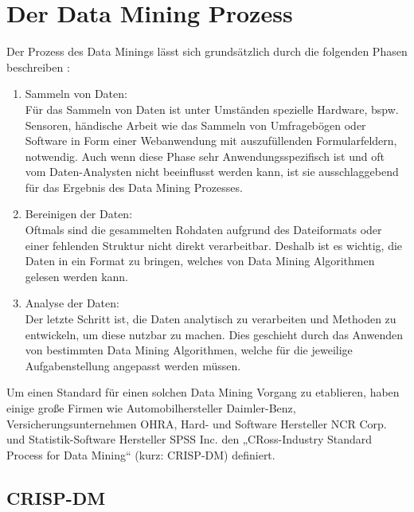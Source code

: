 %


%
%
\chapter{Der Data Mining Prozess}
\label{sec:process}

Der Prozess des Data Minings lässt sich grundsätzlich durch die folgenden Phasen
beschreiben \cite{North:12}:
\begin{enumerate}
\item Sammeln von Daten: \\
Für das Sammeln von Daten ist unter Umständen spezielle Hardware, bspw.
Sensoren, händische Arbeit wie das Sammeln von Umfragebögen oder Software in
Form einer Webanwendung mit auszufüllenden Formularfeldern, notwendig. Auch wenn
diese Phase sehr Anwendungsspezifisch ist und oft vom Daten-Analysten nicht
beeinflusst werden kann, ist sie ausschlaggebend für das Ergebnis des Data
Mining Prozesses.
\item Bereinigen der Daten: \\
Oftmals sind die gesammelten Rohdaten aufgrund des Dateiformats oder einer
fehlenden Struktur nicht direkt verarbeitbar. Deshalb ist es wichtig, die Daten
in ein Format zu bringen, welches von Data Mining Algorithmen gelesen werden
kann.
\item Analyse der Daten: \\
Der letzte Schritt ist, die Daten analytisch zu verarbeiten und Methoden zu
entwickeln, um diese nutzbar zu machen. Dies geschieht durch das Anwenden von
bestimmten Data Mining Algorithmen, welche für die jeweilige Aufgabenstellung
angepasst werden müssen.
\end{enumerate}
Um einen Standard für einen solchen Data Mining Vorgang zu etablieren, haben
einige große Firmen wie Automobilhersteller Daimler-Benz, Versicherungsunternehmen
OHRA, Hard- und Software Hersteller NCR Corp. und Statistik-Software
Hersteller SPSS Inc. den „CRoss-Industry Standard Process for Data Mining“
(kurz: CRISP-DM) definiert.

\pagebreak

\section{CRISP-DM}
\label{sec:process:crispdm}

